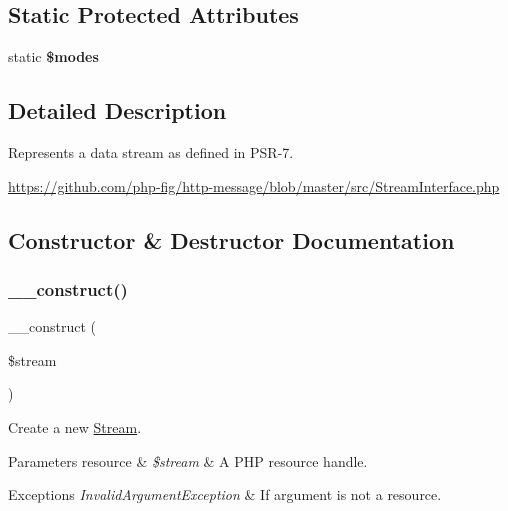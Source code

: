 \subsection*{Static Protected Attributes}
\begin{DoxyCompactItemize}
\item 
static {\bfseries \$modes}
\end{DoxyCompactItemize}


\subsection{Detailed Description}
Represents a data stream as defined in P\+S\+R-\/7.

\mbox{\hyperlink{}{https\+://github.\+com/php-\/fig/http-\/message/blob/master/src/\+Stream\+Interface.\+php}}

\subsection{Constructor \& Destructor Documentation}
\mbox{\label{class_pes_1_1_http_1_1_stream_ab7e7980c180f645083645f626374b690}} 
\subsubsection{\texorpdfstring{\+\_\+\+\_\+construct()}{\_\_construct()}}
{\footnotesize\ttfamily \+\_\+\+\_\+construct (\begin{DoxyParamCaption}\item[{}]{\$stream }\end{DoxyParamCaption})}

Create a new \mbox{\hyperlink{class_pes_1_1_http_1_1_stream}{Stream}}.


\begin{DoxyParams}[1]{Parameters}
resource & {\em \$stream} & A P\+HP resource handle.\\
\hline
\end{DoxyParams}

\begin{DoxyExceptions}{Exceptions}
{\em Invalid\+Argument\+Exception} & If argument is not a resource. \\
\hline
\end{DoxyExceptions}


